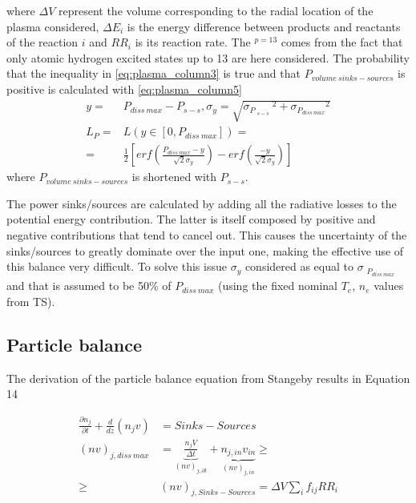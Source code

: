 where $\Delta V$ represent the volume corresponding to the radial location of the plasma considered, $\Delta E_i$ is the energy difference between products and reactants of the reaction $i$ and $RR_i$ is its reaction rate. The ${}^{p=13}$ comes from the fact that only atomic hydrogen excited states up to 13 are here considered. The probability that the inequality in \autoref{eq:plasma_column3} is true and that $P_{volume\ sinks-sources}$ is positive is calculated with \autoref{eq:plasma_column5}
\begin{equation}
\label{eq:plasma_column5}
\begin{aligned}
y =& P_{diss \: max} - P_{s-s}, \sigma_{y} = \sqrt{{\sigma_{P_{\substack{s-s}}}}^2 + {\sigma_{P_{diss \: max}}}^2 }
\\
L_P =& L(y \in [0,P_{diss \: max}]) = \\ =& \frac{1}{2} \left[ erf ( \frac{P_{diss \: max}-y}{ \sqrt{2} \sigma_{y} }) - erf(\frac{-y}{ \sqrt{2} \sigma_{y} } ) \right]
\end{aligned}
\end{equation}
where $P_{volume\ sinks-sources}$ is shortened with $P_{s-s}$.

The power sinks/sources are calculated by adding all the radiative losses to the potential energy contribution. The latter is itself composed by positive and negative contributions that tend to cancel out. This causes the uncertainty of the sinks/sources to greatly dominate over the input one, making the effective use of this balance very difficult. To solve this issue $\sigma_y$ considered as equal to $\sigma_{\substack{P_{diss \: max}}}$ and that is assumed to be 50\% of $P_{diss \: max}$ (using the fixed nominal $T_e$, $n_e$ values from TS). 

\subsection{Particle balance}\label{Particle balance}

The derivation of the particle balance equation from Stangeby\cite{Stangeby2001} results in Equation 14

\begin{equation}
\label{eq:plasma_column6}
\begin{aligned}
\frac{ \partial n_j}{ \partial t} + \frac{d}{dz}   \left(n_j v \right) &= Sinks-Sources \\ (nv)_{j, diss \: max} &={\underbrace{\frac{n_j V }{ \Delta t }}_{(nv)_{j,\partial t}} + \underbrace{n_{j,in} v_{in}}_{(nv)_{j,in}}} \geq \\ \geq & (nv)_{j, Sinks-Sources} = \Delta V \sum_{i} f_{ij} RR_i 
\end{aligned}
\end{equation}

